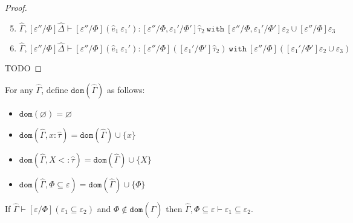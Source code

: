 \documentclass{llncs}
\newcommand{\keywadj}[1]{\mathtt{#1}}
\newcommand{\keyw}[1]{\keywadj{#1}~}
\newcommand{\kw}[1]{\keyw{ #1 }}
\newcommand{\kwa}[1]{\keywadj{ #1 }}
\begin{document}
\begin{proof}
\begin{enumerate}
	\setcounter{enumi}{4}
	\item $\hat \Gamma, [\varepsilon''/\Phi]\hat \Delta \vdash [\varepsilon''/\Phi](\hat e_1~\varepsilon_1'): [\varepsilon''/\Phi, \varepsilon_1'/\Phi']\hat \tau_2~\kw{with} [\varepsilon''/\Phi, \varepsilon_1'/\Phi']\varepsilon_2 \cup [\varepsilon''/\Phi]\varepsilon_3$
	\item $\hat \Gamma, [\varepsilon''/\Phi]\hat \Delta \vdash [\varepsilon''/\Phi](\hat e_1~\varepsilon_1'): [\varepsilon''/\Phi]([\varepsilon_1'/\Phi']\hat \tau_2)~\kw{with} [\varepsilon''/\Phi]([\varepsilon_1'/\Phi']\varepsilon_2 \cup \varepsilon_3)$
\end{enumerate}

 TODO


\end{proof}


\hrulefill

\begin{definition}[Domain]
For any $\hat \Gamma$, define $\kwa{dom}(\hat \Gamma)$ as follows:

\begin{itemize}
	\item $\kwa{dom}(\varnothing) = \varnothing$
	\item $\kwa{dom}(\hat \Gamma, x: \hat \tau) = \kwa{dom}(\hat \Gamma) \cup \{ x \}$
	\item $\kwa{dom}(\hat \Gamma, X <: \hat \tau) = \kwa{dom}(\hat \Gamma) \cup \{ X \}$
	\item $\kwa{dom}(\hat \Gamma, \Phi \subseteq \varepsilon) = \kwa{dom}(\hat \Gamma) \cup \{ \Phi \}$
\end{itemize}

\end{definition}


\hrulefill
 
\begin{lemma}
If $\hat \Gamma \vdash [\varepsilon/\Phi](\varepsilon_1 \subseteq \varepsilon_2)$ and $\Phi \notin \kwa{dom}(\hat \Gamma)$ then $\hat \Gamma, \Phi \subseteq \varepsilon \vdash \varepsilon_1 \subseteq \varepsilon_2$.
\end{lemma}
\end{document}
